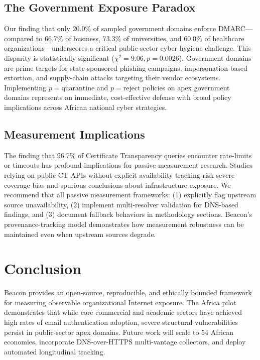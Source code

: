 \documentclass[conference]{IEEEtran}
\begin{document}
\subsection{The Government Exposure Paradox}
\label{subsec:govt_paradox}
Our finding that only 20.0\% of sampled government domains enforce DMARC---compared to 66.7\% of business, 73.3\% of universities, and 60.0\% of healthcare organizations---underscores a critical public-sector cyber hygiene challenge. This disparity is statistically significant ($\chi^2 = 9.06, p = 0.0026$). Government domains are prime targets for state-sponsored phishing campaigns, impersonation-based extortion, and supply-chain attacks targeting their vendor ecosystems. Implementing $p=\text{quarantine}$ and $p=\text{reject}$ policies on apex government domains represents an immediate, cost-effective defense with broad policy implications across African national cyber strategies.

\subsection{Measurement Implications}
\label{subsec:measurement_implications}
The finding that 96.7\% of Certificate Transparency queries encounter rate-limits or timeouts has profound implications for passive measurement research. Studies relying on public CT APIs without explicit availability tracking risk severe coverage bias and spurious conclusions about infrastructure exposure. We recommend that all passive measurement frameworks: (1) explicitly flag upstream source unavailability, (2) implement multi-resolver validation for DNS-based findings, and (3) document fallback behaviors in methodology sections. Beacon's provenance-tracking model demonstrates how measurement robustness can be maintained even when upstream sources degrade.

\section{Conclusion}

Beacon provides an open-source, reproducible, and ethically bounded framework for measuring observable organizational Internet exposure. The Africa pilot demonstrates that while core commercial and academic sectors have achieved high rates of email authentication adoption, severe structural vulnerabilities persist in public-sector apex domains. Future work will scale to 54 African economies, incorporate DNS-over-HTTPS multi-vantage collectors, and deploy automated longitudinal tracking.
\end{document}

